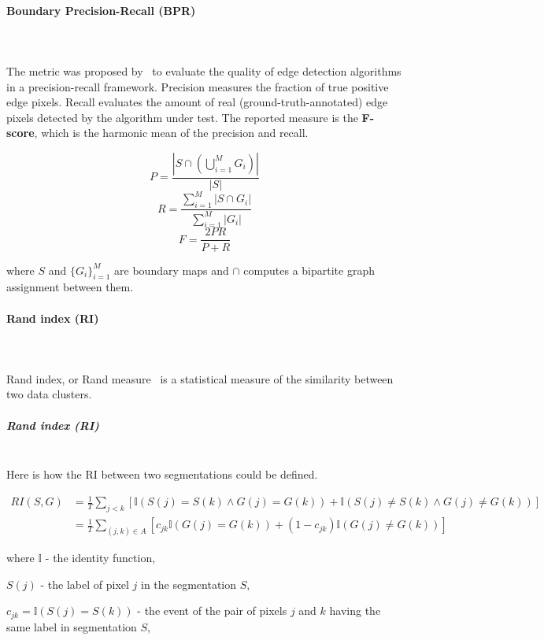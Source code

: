 \paragraph{Boundary Precision-Recall (BPR)}\mbox{}\\\mbox{}\\
\label{par:ch4-BPR-maths}
The metric was proposed by~\cite{Arbelaez11} to evaluate the quality of edge detection algorithms in a precision-recall framework. Precision measures the fraction of true positive edge pixels. Recall evaluates the amount of real (\eg ground-truth-annotated) edge pixels detected by the algorithm under test. The reported measure is the \textbf{F-score}, which is the harmonic mean of the precision and recall.

\[
P=\frac{\left|S\cap\left(\bigcup\limits _{i=1}^{M}G_{i}\right)\right|}{|S|}
\]
\[
R=\frac{{\sum\limits _{i=1}^{M}\left|S\cap G_{i}\right|}}{\sum\limits _{i=1}^{M}\left|G_{i}\right|}
\]
\[
F=\frac{2PR}{P+R}
\]

where $S$ and $\{G_{i}\}_{i=1}^{M}$ are boundary maps and $\cap$
computes a bipartite graph assignment between them.

\paragraph{Rand index (RI)}\mbox{}\\\mbox{}\\
Rand index, or Rand measure~\cite{rand1971objective} is a statistical measure of the similarity between two data clusters.

\subparagraph*{Rand index (RI)}\mbox{}\\
Here is how the RI between two segmentations could be defined.

\begin{align*}
RI(S,G) & =\frac{1}{T}\sum\limits _{j<k}\left[\mathbb{I}\left(S(j)=S(k)\wedge G(j)=G(k)\right)+\mathbb{I}\left(S(j)\neq S(k)\wedge G(j)\neq G(k)\right)\right]\\
 & =\frac{1}{T}\sum\limits _{(j,k)\in A}\left[c_{jk}\mathbb{I}\left(G(j)=G(k)\right)+(1-c_{jk})\mathbb{I}\left(G(j)\neq G(k)\right)\right]
\end{align*}

where $\mathbb{I}$ - the identity function,

$S(j)$ - the label of pixel $j$ in the segmentation $S$,

$c_{jk}=\mathbb{I}\left(S(j)=S(k)\right)$ - the event of the pair
of pixels $j$ and $k$ having the same label in segmentation $S$,


